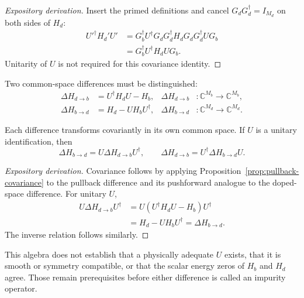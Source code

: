 \begin{proof}[Expository derivation]
Insert the primed definitions and cancel
$G_dG_d^{\dagger}=I_{M_d}$ on both sides of $H_d$:
\begin{align}
  U'^{\dagger}H_d'U'
  &=G_b^{\dagger}U^{\dagger}G_d
    G_d^{\dagger}H_dG_d
    G_d^{\dagger}UG_b\\
  &=G_b^{\dagger}U^{\dagger}H_dUG_b.
\end{align}
Unitarity of $U$ is not required for this covariance identity.
\end{proof}

Two common-space differences must be distinguished:
\begin{align}
  \Delta H_{d\to b}
  &=U^{\dagger}H_dU-H_b,
  &\Delta H_{d\to b}&:\mathbb C^{M_b}\to\mathbb C^{M_b},\\
  \Delta H_{b\to d}
  &=H_d-UH_bU^{\dagger},
  &\Delta H_{b\to d}&:\mathbb C^{M_d}\to\mathbb C^{M_d}.
\end{align}

\begin{proposition}
\label{prop:aligned-difference-equivalence}
Each difference transforms covariantly in its own common space. If $U$ is a
unitary identification, then
\begin{equation}
  \Delta H_{b\to d}
  =U\Delta H_{d\to b}U^{\dagger},
  \qquad
  \Delta H_{d\to b}
  =U^{\dagger}\Delta H_{b\to d}U.
\end{equation}
\end{proposition}

\begin{proof}[Expository derivation]
Covariance follows by applying Proposition~\ref{prop:pullback-covariance} to the
pullback difference and its pushforward analogue to the doped-space difference.
For unitary $U$,
\begin{align}
  U\Delta H_{d\to b}U^{\dagger}
  &=U(U^{\dagger}H_dU-H_b)U^{\dagger}\\
  &=H_d-UH_bU^{\dagger}
  =\Delta H_{b\to d}.
\end{align}
The inverse relation follows similarly.
\end{proof}

This algebra does not establish that a physically adequate $U$ exists, that it
is smooth or symmetry compatible, or that the scalar energy zeros of $H_b$ and
$H_d$ agree. Those remain prerequisites before either difference is called an
impurity operator.

